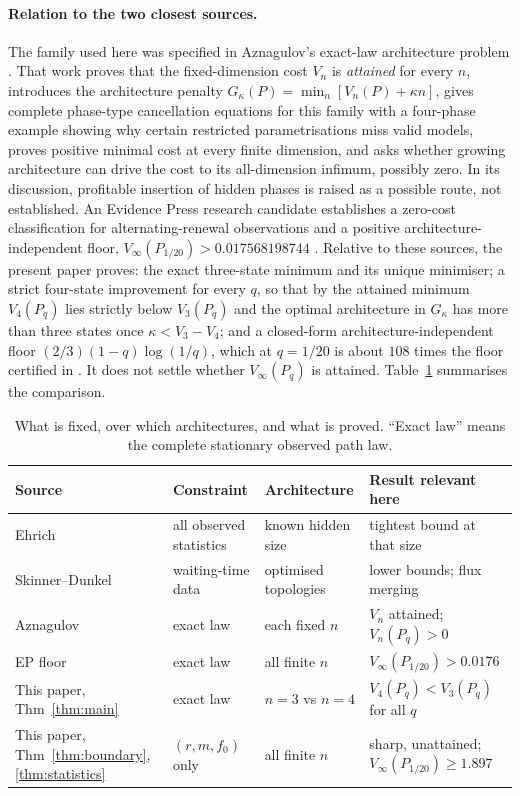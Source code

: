 \documentclass[11pt,a4paper]{article}
\theoremstyle{remark}\newtheorem{remark}[theorem]{Remark}
\begin{document}
\paragraph{Relation to the two closest sources.}
The family used here was specified in Aznagulov's exact-law architecture
problem \cite{aznagulov}. That work proves that the fixed-dimension cost
$V_n$ is \emph{attained} for every $n$, introduces the architecture penalty
$G_\kappa(P)=\min_n[V_n(P)+\kappa n]$, gives complete phase-type
cancellation equations for this family with a four-phase example showing why
certain restricted parametrisations miss valid models, proves positive
minimal cost at every finite dimension, and asks whether growing architecture
can drive the cost to its all-dimension infimum, possibly zero. In its
discussion, profitable insertion of hidden phases is raised as a possible
route, not established. An Evidence Press research candidate establishes a
zero-cost classification for alternating-renewal observations and a positive
architecture-independent floor, $V_\infty(P_{1/20})>0.017568198744$
\cite{ep_floor}. Relative to these sources, the present paper proves:
the exact three-state minimum and its unique minimiser; a strict four-state
improvement for every $q$, so that by \cite{aznagulov} the attained minimum
$V_4(P_q)$ lies strictly below $V_3(P_q)$ and the optimal architecture in
$G_\kappa$ has more than three states once $\kappa<V_3-V_4$; and a closed-form
architecture-independent floor $(2/3)(1-q)\log(1/q)$, which at $q=1/20$ is
about $108$ times the floor certified in \cite{ep_floor}. It does not settle whether
$V_\infty(P_q)$ is attained. Table~\ref{tab:compare} summarises the
comparison.

\begin{table}[tb]
\centering\small
\caption{What is fixed, over which architectures, and what is proved.
``Exact law'' means the complete stationary observed path law.}
\label{tab:compare}
\begin{tabular}{@{}p{}p{}p{}p{}@{}}
\toprule
Source & Constraint & Architecture & Result relevant here\\
\midrule
Ehrich \cite{ehrich} & all observed statistics & known hidden size & tightest bound at that size\\
Skinner--Dunkel \cite{skinner_wait,skinner_improved} & waiting-time data & optimised topologies & lower bounds; flux merging\\
Aznagulov \cite{aznagulov} & exact law & each fixed $n$ & $V_n$ attained; $V_n(P_q)>0$\\
EP floor \cite{ep_floor} & exact law & all finite $n$ & $V_\infty(P_{1/20})>0.0176$\\
This paper, Thm~\ref{thm:main} & exact law & $n=3$ vs $n=4$ & $V_4(P_q)<V_3(P_q)$ for all $q$\\
This paper, Thm~\ref{thm:boundary}, \ref{thm:statistics} & $(r,m,f_0)$ only & all finite $n$ & sharp, unattained; $V_\infty(P_{1/20})\geq1.897$\\
\bottomrule
\end{tabular}
\end{table}
\end{document}
